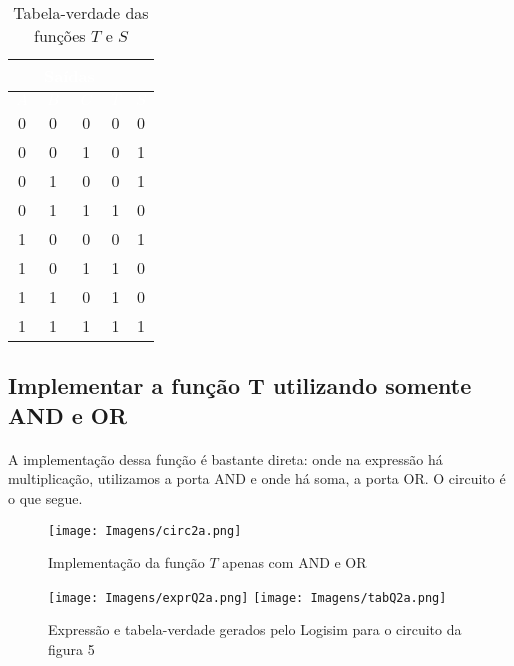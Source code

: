\documentclass[a4paper, 12pt]{article}
\begin{document}
\begin{table}[H]
    \centering
    \begin{tabular}{|c|c|c|c|c|}
        \hline
        \rowcolor{black}
        \multicolumn{3}{|c|}{\textbf{\textcolor{white}{Entradas}}} & \multicolumn{2}{|c|}{\textbf{\textcolor{white}{Saídas}}} \\ \hline
        \rowcolor{black}
        \textcolor{white}{$A$} & \textcolor{white}{$B$} & \textcolor{white}{$C$} & \textcolor{white}{$T$} & \textcolor{white}{$S$} \\ \hline
        0 & 0 & 0 & 0 & 0 \\ \hline
        \rowcolor{lightgray}
        0 & 0 & 1 & 0 & 1 \\ \hline
        0 & 1 & 0 & 0 & 1 \\ \hline
        \rowcolor{lightgray}
        0 & 1 & 1 & 1 & 0 \\ \hline
        1 & 0 & 0 & 0 & 1 \\ \hline
        \rowcolor{lightgray}
        1 & 0 & 1 & 1 & 0 \\ \hline
        1 & 1 & 0 & 1 & 0 \\ \hline
        \rowcolor{lightgray}
        1 & 1 & 1 & 1 & 1 \\ \hline
    \end{tabular}
    \caption{Tabela-verdade das funções $T$ e $S$}
\end{table}

\subsection{Implementar a função T utilizando somente AND e OR}
\paragraph{}
A implementação dessa função é bastante direta: onde na expressão há multiplicação, utilizamos a porta AND e onde há soma, a porta OR. O circuito é o que segue.

\begin{figure}[H]
    \centering
    \texttt{[image: Imagens/circ2a.png]}
    \caption{Implementação da função $T$ apenas com AND e OR}
\end{figure}

\begin{figure}[H]
    \centering
    \texttt{[image: Imagens/exprQ2a.png]}
    \texttt{[image: Imagens/tabQ2a.png]} \\
    \caption{Expressão e tabela-verdade gerados pelo Logisim para o circuito da figura 5}
\end{figure}
\end{document}
